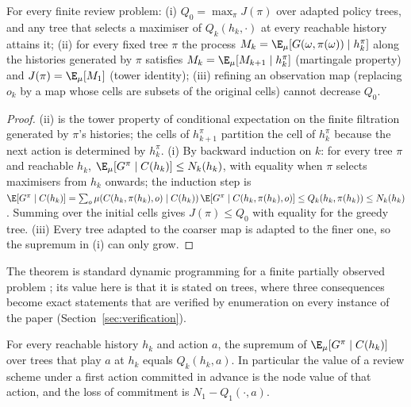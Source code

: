 \begin{theorem}\label{thm:envelope}
For every finite review problem: (i) $Q_0=\max_\pi J(\pi)$ over adapted policy trees, and any tree that selects a maximiser of $Q_k(h_k,\cdot)$ at every reachable history attains it; (ii) for every fixed tree $\pi$ the process $M_k=\E_\mu[G(\omega,\pi(\omega))\mid h_k^\pi]$ along the histories generated by $\pi$ satisfies $M_k=\E_\mu[M_{k+1}\mid h_k^\pi]$ (martingale property) and $J(\pi)=\E_\mu[M_1]$ (tower identity); (iii) refining an observation map (replacing $o_k$ by a map whose cells are subsets of the original cells) cannot decrease $Q_0$.
\end{theorem}

\begin{proof}
(ii) is the tower property of conditional expectation on the finite filtration generated by $\pi$'s histories; the cells of $h^\pi_{k+1}$ partition the cell of $h^\pi_k$ because the next action is determined by $h_k^\pi$. (i) By backward induction on $k$: for every tree $\pi$ and reachable $h_k$, $\E_\mu[G^\pi\mid C(h_k)]\le N_k(h_k)$, with equality when $\pi$ selects maximisers from $h_k$ onwards; the induction step is $\E[G^\pi\mid C(h_k)]=\sum_o\mu(C(h_k,\pi(h_k),o)\mid C(h_k))\,\E[G^\pi\mid C(h_k,\pi(h_k),o)]\le Q_k(h_k,\pi(h_k))\le N_k(h_k)$. Summing over the initial cells gives $J(\pi)\le Q_0$ with equality for the greedy tree. (iii) Every tree adapted to the coarser map is adapted to the finer one, so the supremum in (i) can only grow.
\end{proof}

The theorem is standard dynamic programming for a finite partially observed problem \cite{Astrom1965,BertsekasShreve1978}; its value here is that it is stated on trees, where three consequences become exact statements that are verified by enumeration on every instance of the paper (Section~\ref{sec:verification}).

\begin{corollary}\label{cor:prefix}
For every reachable history $h_k$ and action $a$, the supremum of $\E_\mu[G^\pi\mid C(h_k)]$ over trees that play $a$ at $h_k$ equals $Q_k(h_k,a)$. In particular the value of a review scheme under a first action committed in advance is the node value of that action, and the loss of commitment is $N_1-Q_1(\cdot,a)$.
\end{corollary}

